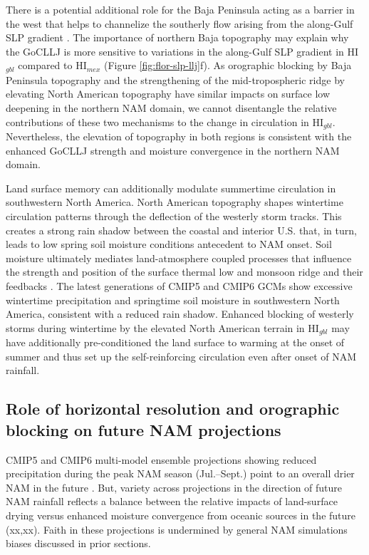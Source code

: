 \documentclass[draft]{agujournal2019}
\begin{document}
There is a potential additional role for the Baja Peninsula acting as a barrier in the west that helps to channelize the southerly flow arising from the along-Gulf SLP gradient \cite{pascale16jc}. The importance of northern Baja topography may explain why the GoCLLJ is more sensitive to variations in the along-Gulf SLP gradient in HI$_{gbl}$ compared to HI$_{mex}$ (Figure \ref{fig:flor-slp-llj}f). As orographic blocking by Baja Peninsula topography and the strengthening of the mid-tropospheric ridge by elevating North American topography have similar impacts on surface low deepening in the northern NAM domain, we cannot disentangle the relative contributions of these two mechanisms to the change in circulation in HI$_{gbl}$. Nevertheless, the elevation of topography in both regions is consistent with the enhanced GoCLLJ strength and moisture convergence in the northern NAM domain.

Land surface memory can additionally modulate summertime circulation in southwestern North America. North American topography shapes wintertime circulation patterns through the deflection of the westerly storm tracks. This creates a strong rain shadow between the coastal and interior U.S. \cite{johnson25jc,sexton26jc} that, in turn, leads to low spring soil moisture conditions antecedent to NAM onset. Soil moisture ultimately mediates land-atmosphere coupled processes that influence the strength and position of the surface thermal low and monsoon ridge and their feedbacks \cite{higgins00jc,grantz07jc,zhu07jc,notaro11grl,cerezo-mota16ijc,zeppetello24jc}. The latest generations of CMIP5 and CMIP6 GCMs show excessive wintertime precipitation \cite{sexton26jc} and springtime soil moisture \cite{hernandez22jgra} in southwestern North America, consistent with a reduced rain shadow. Enhanced blocking of westerly storms during wintertime by the elevated North American terrain in HI$_{gbl}$ may have additionally pre-conditioned the land surface to warming at the onset of summer \cite{cerezo-mota16ijc} and thus set up the self-reinforcing circulation even after onset of NAM rainfall.  %

\subsection{Role of horizontal resolution and orographic blocking on future NAM projections}
CMIP5 and CMIP6 multi-model ensemble projections showing reduced precipitation during the peak NAM season (Jul.--Sept.) point to an overall drier NAM in the future \cite{cook13jgra,pascale17ncc,hernandez22jgra,ye23jc}. But, variety across projections in the direction of future NAM rainfall reflects a balance between the relative impacts of land-surface drying versus enhanced moisture convergence from oceanic sources in the future (xx,xx). Faith in these projections is undermined by general NAM simulations biases discussed in prior sections.
\end{document}
